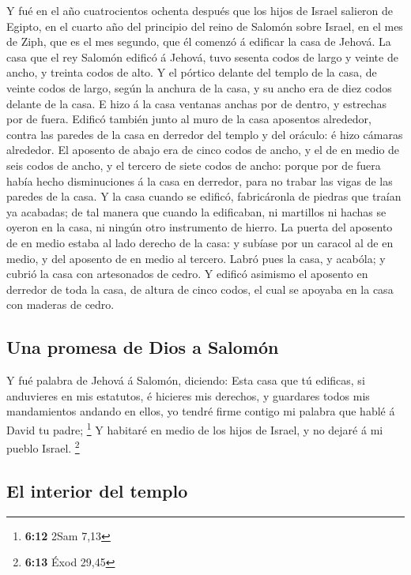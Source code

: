  Y fué en el año cuatrocientos ochenta después que los hijos
de Israel salieron de Egipto, en el cuarto año del principio del reino
de Salomón sobre Israel, en el mes de Ziph, que es el mes segundo, que
él comenzó á edificar la casa de Jehová.  La casa que el rey
Salomón edificó á Jehová, tuvo sesenta codos de largo y veinte de ancho,
y treinta codos de alto.  Y el pórtico delante del templo de
la casa, de veinte codos de largo, según la anchura de la casa, y su
ancho era de diez codos delante de la casa.  E hizo á la
casa ventanas anchas por de dentro, y estrechas por de fuera.
 Edificó también junto al muro de la casa aposentos
alrededor, contra las paredes de la casa en derredor del templo y del
oráculo: é hizo cámaras alrededor.  El aposento de abajo era
de cinco codos de ancho, y el de en medio de seis codos de ancho, y el
tercero de siete codos de ancho: porque por de fuera había hecho
disminuciones á la casa en derredor, para no trabar las vigas de las
paredes de la casa.  Y la casa cuando se edificó,
fabricáronla de piedras que traían ya acabadas; de tal manera que cuando
la edificaban, ni martillos ni hachas se oyeron en la casa, ni ningún
otro instrumento de hierro.  La puerta del aposento de en
medio estaba al lado derecho de la casa: y subíase por un caracol al de
en medio, y del aposento de en medio al tercero.  Labró pues
la casa, y acabóla; y cubrió la casa con artesonados de cedro.
 Y edificó asimismo el aposento en derredor de toda la
casa, de altura de cinco codos, el cual se apoyaba en la casa con
maderas de cedro.

\hypertarget{una-promesa-de-dios-a-salomuxf3n}{%
\subsection{Una promesa de Dios a
Salomón}\label{una-promesa-de-dios-a-salomuxf3n}}

 Y fué palabra de Jehová á Salomón, diciendo: 
Esta casa que tú edificas, si anduvieres en mis estatutos, é hicieres
mis derechos, y guardares todos mis mandamientos andando en ellos, yo
tendré firme contigo mi palabra que hablé á David tu padre; \footnote{\textbf{6:12}
  2Sam 7,13}  Y habitaré en medio de los hijos de Israel, y
no dejaré á mi pueblo Israel. \footnote{\textbf{6:13} Éxod 29,45}

\hypertarget{el-interior-del-templo}{%
\subsection{El interior del templo}\label{el-interior-del-templo}}

